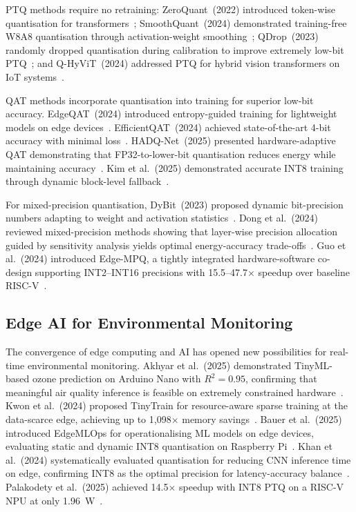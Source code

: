 PTQ methods require no retraining: ZeroQuant~(2022) introduced token-wise quantisation for transformers~\cite{zeroquant2022}; SmoothQuant~(2024) demonstrated training-free W8A8 quantisation through activation-weight smoothing~\cite{smoothquant2024}; QDrop~(2023) randomly dropped quantisation during calibration to improve extremely low-bit PTQ~\cite{qdrop2023}; and Q-HyViT~(2024) addressed PTQ for hybrid vision transformers on IoT systems~\cite{qhyvit2024}.

QAT methods incorporate quantisation into training for superior low-bit accuracy. EdgeQAT~(2024) introduced entropy-guided training for lightweight models on edge devices~\cite{edgeqat2024}. EfficientQAT~(2024) achieved state-of-the-art 4-bit accuracy with minimal loss~\cite{efficientqat2024}. HADQ-Net~(2025) presented hardware-adaptive QAT demonstrating that FP32-to-lower-bit quantisation reduces energy while maintaining accuracy~\cite{hadqnet2025}. Kim et al.~(2025) demonstrated accurate INT8 training through dynamic block-level fallback~\cite{accurateint8_2025}.

For mixed-precision quantisation, DyBit~(2023) proposed dynamic bit-precision numbers adapting to weight and activation statistics~\cite{dybit2023}. Dong et al.~(2024) reviewed mixed-precision methods showing that layer-wise precision allocation guided by sensitivity analysis yields optimal energy-accuracy trade-offs~\cite{dong2024efficient}. Guo et al.~(2024) introduced Edge-MPQ, a tightly integrated hardware-software co-design supporting INT2--INT16 precisions with 15.5--47.7$\times$ speedup over baseline RISC-V~\cite{edgempq2024}.

\subsection{Edge AI for Environmental Monitoring}
\label{sec:rw_edgeai}

The convergence of edge computing and AI has opened new possibilities for real-time environmental monitoring. Akhyar et al.~(2025) demonstrated TinyML-based ozone prediction on Arduino Nano with $R^2 = 0.95$, confirming that meaningful air quality inference is feasible on extremely constrained hardware~\cite{akhyar2025tinyml}. Kwon et al.~(2024) proposed TinyTrain for resource-aware sparse training at the data-scarce edge, achieving up to 1,098$\times$ memory savings~\cite{tinytrain2024}. Bauer et al.~(2025) introduced EdgeMLOps for operationalising ML models on edge devices, evaluating static and dynamic INT8 quantisation on Raspberry Pi~\cite{edgemlops2025}. Khan et al.~(2024) systematically evaluated quantisation for reducing CNN inference time on edge, confirming INT8 as the optimal precision for latency-accuracy balance~\cite{enhancingcnn2024}. Palakodety et al.~(2025) achieved 14.5$\times$ speedup with INT8 PTQ on a RISC-V NPU at only 1.96~W~\cite{palakodety2025tpu}.

